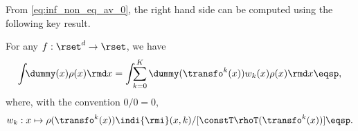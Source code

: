  
%  

From \eqref{eq:inf_non_eq_av_0}, the right hand side can be computed using the following key result.
\begin{theorem}
 \label{theo:inf_non_eq}
 For any $f:\rset^d \to \rset$, we have
\begin{equation}
\label{eq:key-relation}
\int_{} \dummy(x) \rho(x)  \rmd x =
\int_{} \sum_{k=0}^K  \dummy(\transfo^{k}(x)) w_k(x) \rho(x)  \rmd x \eqsp,
\end{equation}
where, with the convention $0/0=0$, 
\begin{equation}
\label{eq:w_k_first_def}
w_k: x\mapsto \rho(\transfo^{k}(x))\indi{\rmi}(x,k) / [\constT\rhoT(\transfo^{k}(x))]  \eqsp.
\end{equation}
\end{theorem}

